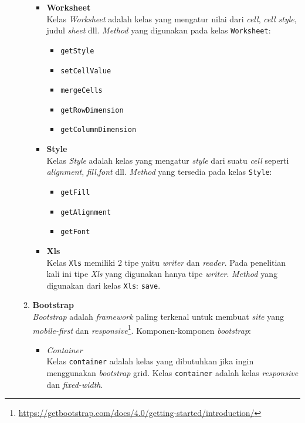 \documentclass[a4paper,twoside]{article}
\begin{document}
\begin{enumerate}
\begin{enumerate}
\begin{itemize}
		\item \textbf{Worksheet} \\
		Kelas \textit{Worksheet} adalah kelas yang mengatur nilai dari \textit{cell}, \textit{cell style}, judul \textit{sheet} dll. \textit{Method} yang digunakan pada kelas \texttt{Worksheet}:
		\begin{itemize}
			\item \texttt{getStyle}
			\item \texttt{setCellValue}
			\item \texttt{mergeCells}
			\item \texttt{getRowDimension}
			\item \texttt{getColumnDimension}
		\end{itemize}
	
	\item \textbf{Style} \\
	Kelas \textit{Style} adalah kelas yang mengatur \textit{style} dari suatu \textit{cell} seperti \textit{alignment}, \textit{fill},\textit{font} dll. \textit{Method} yang tersedia pada kelas \texttt{Style}:
	\begin{itemize}
		\item \texttt{getFill}
		\item \texttt{getAlignment}
		\item \texttt{getFont}
	\end{itemize}

	\item \textbf{Xls} \\
	Kelas \texttt{Xls} memiliki 2 tipe yaitu \textit{writer} dan \textit{reader}. Pada penelitian kali ini tipe \textit{Xls} yang digunakan hanya tipe \textit{writer}. \textit{Method} yang digunakan dari kelas \texttt{Xls}: \texttt{save}. 
	\end{itemize}

	\item \textbf{Bootstrap} \\
	\textit{Bootstrap} adalah \textit{framework} paling terkenal untuk membuat \textit{site} yang \textit{mobile-first} dan \textit{res\-pon\-sive}\footnote{\url{https://getbootstrap.com/docs/4.0/getting-started/introduction/}}. Komponen-komponen \textit{bootstrap}:
	\begin{itemize}
		\item \textit{Container} \\
		Kelas \texttt{container} adalah kelas yang dibutuhkan jika ingin menggunakan \textit{bootstrap} grid. Kelas \texttt{container} adalah kelas \textit{responsive} dan \textit{fixed-width}.
		

\end{itemize}
\end{enumerate}
\end{enumerate}
\end{document}
